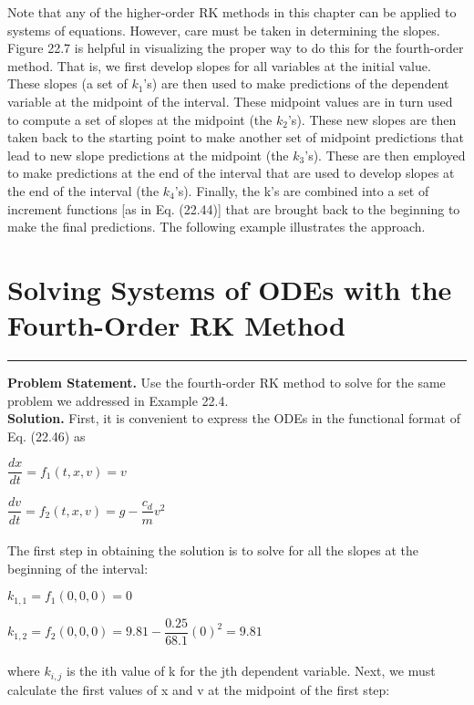 \documentclass[../main.tex]{subfiles}
\begin{document}
Note that any of the higher-order RK methods in this chapter can be applied to systems of
equations. However, care must be taken in determining the slopes. Figure 22.7 is helpful in
visualizing the proper way to do this for the fourth-order method. That is, we first develop
slopes for all variables at the initial value. These slopes (a set of $k_1$'s) are then used to make
predictions of the dependent variable at the midpoint of the interval. These midpoint values are in turn used to compute a set of slopes at the midpoint (the $k_2$'s). These new slopes
are then taken back to the starting point to make another set of midpoint predictions that
lead to new slope predictions at the midpoint (the $k_3$'s). These are then employed to make
predictions at the end of the interval that are used to develop slopes at the end of the interval (the $k_4$'s). Finally, the k's are combined into a set of increment functions [as in
Eq. (22.44)] that are brought back to the beginning to make the final predictions. The following example illustrates the approach.

\vspace{0,3in}
\section{Solving Systems of ODEs with the Fourth-Order RK Method}
\vspace{0,1in}
\hrule
\vspace{0,1in}
\textbf{Problem Statement.} Use the fourth-order RK method to solve for the same problem we
addressed in Example 22.4.
\vspace{0.2in}\\
\textbf{Solution.} First, it is convenient to express the ODEs in the functional format of
Eq. (22.46) as

$\dfrac{dx}{dt} = f_1(t,x,v) = v$

$\dfrac{dv}{dt} = f_2(t,x,v) = g - \dfrac{c_d}{m} v^2$\\
\\
The first step in obtaining the solution is to solve for all the slopes at the beginning of the
interval:

$k_{1,1} = f_1(0,0,0) = 0$

$k_{1,2} = f_2(0,0,0) = 9.81 - \dfrac{0.25}{68.1}(0)^2 = 9.81$\\
\\
where $k_{i,j}$ is the ith value of k for the jth dependent variable. Next, we must calculate the
first values of x and v at the midpoint of the first step:
\end{document}
